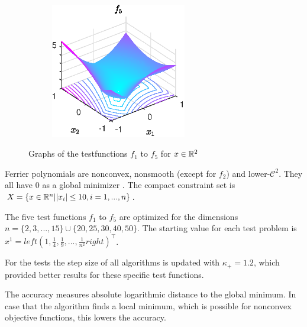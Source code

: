 \begin{figure}[ht]
\begin{subfigure}{0.47\textwidth}
		\vfil
	\end{subfigure}
	\begin{subfigure}{0.49\textwidth}
		\includegraphics[width=0.65\textwidth]{Pictures/Plots/testfun_f5}
	\end{subfigure}
	\caption[Ferrier polynomials]{Graphs of the testfunctions $f_1$ to $f_5$ for $x\in\mathbb{R}^2$}
	\label{fig_ferr_pol}
\end{figure}

Ferrier polynomials are nonconvex, nonsmooth (except for \(f_2\)) and lower-\(\mathcal{C}^2\). They all have \(0\) as a global minimizer \cite[p. 23]{Hare2016}. The compact constraint set is \(X=\{x \in \mathbb{R}^n|\lvert x_i\rvert \leq 10, i = 1,...,n \}\).

The five test functions \(f_1\) to \(f_5\) are optimized for the dimensions \(n=\{2,3,...,15\} \cup \{20,25,30,40,50\}\).
The starting value for each test problem is \(x^1=left(1,\frac{1}{4},\frac{1}{9},...,\frac{1}{n^2}right)^{\top}\).

For the tests the step size of all algorithms is updated with \(\kappa_+ = 1.2\), which provided better results for these specific test functions.

The accuracy measures absolute logarithmic distance to the global minimum. In case that the algorithm finds a local minimum, which is possible for nonconvex objective functions, this lowers the accuracy.


